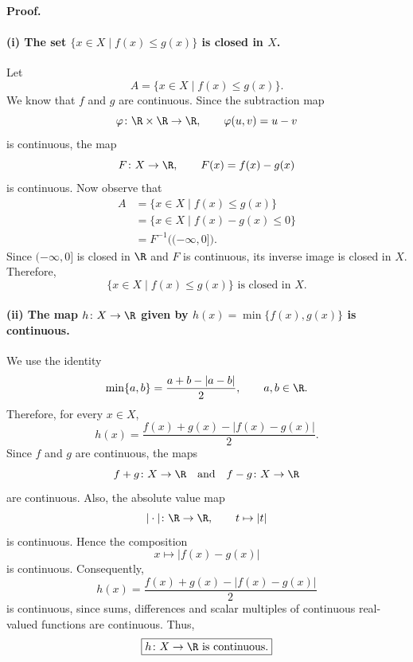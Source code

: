 
\textbf{Proof.}

\paragraph{(i) The set $\{x\in X\mid f(x)\le g(x)\}$ is closed in $X$.}
Let
\[ A=\{x\in X\mid f(x)\le g(x)\}. \]
We know that $f$ and $g$ are continuous. Since the subtraction map
\[ \varphi\colon\R\times\R\to\R,\qquad\varphi(u,v)=u-v \]
is continuous, the map
\[ F\colon X\to\R,\qquad F(x)=f(x)-g(x) \]
is continuous. Now observe that
\begin{align*}
  A &= \{x\in X\mid f(x)\le g(x)\}\\
    &= \{x\in X\mid f(x)-g(x)\le0\}\\
    &= F^{-1}\bigl((-\infty,0]\bigr).
\end{align*}
Since $(-\infty,0]$ is closed in $\R$ and $F$ is continuous, its inverse image is closed in $X$.
Therefore,
\[ \boxed{\{x\in X\mid f(x)\le g(x)\}\text{ is closed in }X.} \]

\paragraph{(ii) The map $h\colon X\to\R$ given by $h(x)=\min\{f(x),g(x)\}$ is continuous.}
We use the identity
\[ \min\{a,b\}=\frac{a+b-|a-b|}{2},\qquad a,b\in\R. \]
Therefore, for every $x\in X$,
\[ h(x)=\frac{f(x)+g(x)-|f(x)-g(x)|}{2}. \]
Since $f$ and $g$ are continuous, the maps
\[ f+g\colon X\to\R\quad\text{and}\quad f-g\colon X\to\R \]
are continuous. Also, the absolute value map
\[ |\cdot|\colon\R\to\R,\qquad t\mapsto|t| \]
is continuous. Hence the composition
\[ x\mapsto|f(x)-g(x)| \]
is continuous. Consequently,
\[ h(x)=\frac{f(x)+g(x)-|f(x)-g(x)|}{2} \]
is continuous, since sums, differences and scalar multiples of continuous real-valued functions
are continuous. Thus,
\[ \boxed{h\colon X\to\R\text{ is continuous.}} \]
